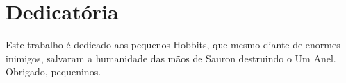 \section*{Dedicatória}

Este trabalho é dedicado aos pequenos Hobbits, que mesmo diante de enormes inimigos, salvaram a humanidade das mãos de Sauron destruindo o Um Anel. Obrigado, pequeninos.

\pagebreak
